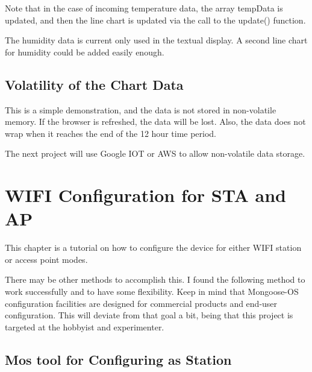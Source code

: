 \documentclass[oneside,letterpaper,12pt]{book}
\begin{document}
Note that in the case of incoming temperature data, the array tempData
is updated, and then the line chart is updated via the call to the
update() function.

The humidity data is current only used in the textual display. A second
line chart for humidity could be added easily enough.

\section{Volatility of the Chart
Data}\label{volatility-of-the-chart-data}

This is a simple demonstration, and the data is not stored in
non-volatile memory. If the browser is refreshed, the data will be lost.
Also, the data does not wrap when it reaches the end of the 12 hour time
period.

The next project will use Google IOT or AWS to allow non-volatile data
storage.

\chapter{WIFI Configuration for STA and
AP}\label{wifi-configuration-for-sta-and-ap}

This chapter is a tutorial on how to configure the device for either
WIFI station or access point modes.

There may be other methods to accomplish this. I found the following
method to work successfully and to have some flexibility. Keep in mind
that Mongoose-OS configuration facilities are designed for commercial
products and end-user configuration. This will deviate from that goal a
bit, being that this project is targeted at the hobbyist and
experimenter.

\section{Mos tool for Configuring as
Station}\label{mos-tool-for-configuring-as-station}
\end{document}
